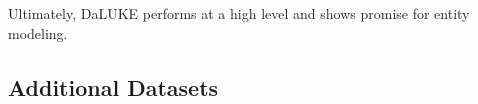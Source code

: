 \documentclass[main.tex]{subfiles}
\begin{document}
Ultimately, DaLUKE performs at a high level and shows promise for entity modeling.

\subsection{Additional Datasets}



\end{document}
